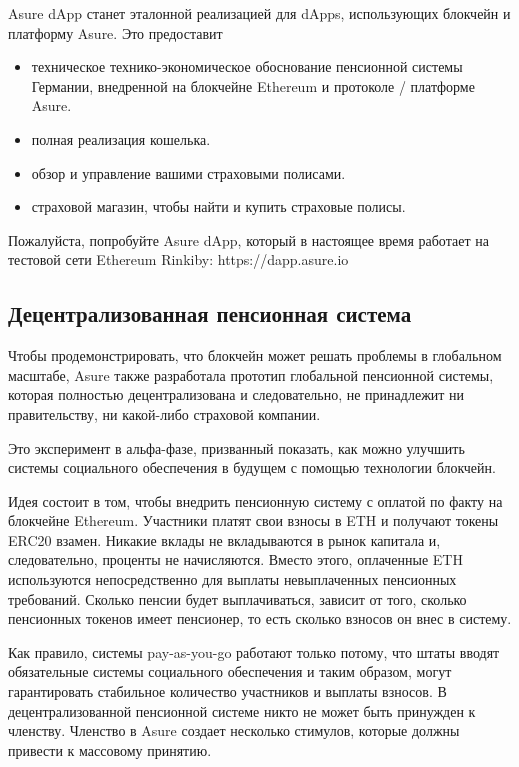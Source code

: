 Asure dApp станет эталонной реализацией для dApps, использующих блокчейн и платформу Asure.
\newline\newline
Это предоставит
\begin{itemize}
\item техническое технико-экономическое обоснование пенсионной системы Германии, внедренной на блокчейне Ethereum и протоколе / платформе Asure.
\item полная реализация кошелька.
\item обзор и управление вашими страховыми полисами.
\item страховой магазин, чтобы найти и купить страховые полисы.
\end{itemize}

Пожалуйста, попробуйте Asure dApp, который в настоящее время работает на тестовой сети Ethereum Rinkiby: https://dapp.asure.io

\subsection{Децентрализованная пенсионная система}

Чтобы продемонстрировать, что блокчейн может решать проблемы в глобальном масштабе, Asure также разработала прототип глобальной пенсионной системы, которая полностью децентрализована и следовательно, не принадлежит ни правительству, ни какой-либо страховой компании.

Это эксперимент в альфа-фазе, призванный показать, как можно улучшить системы социального обеспечения в будущем с помощью технологии блокчейн.

Идея состоит в том, чтобы внедрить пенсионную систему с оплатой по факту на блокчейне Ethereum. Участники платят свои взносы в ETH и получают токены ERC20 взамен. Никакие вклады не вкладываются в рынок капитала и, следовательно, проценты не начисляются. Вместо этого, оплаченные ETH используются непосредственно для выплаты невыплаченных пенсионных требований. Сколько пенсии будет выплачиваться, зависит от того, сколько пенсионных токенов имеет пенсионер, то есть сколько взносов он внес в систему.

Как правило, системы pay-as-you-go работают только потому, что штаты вводят обязательные системы социального обеспечения и таким образом, могут гарантировать стабильное количество участников и выплаты взносов. В децентрализованной пенсионной системе никто не может быть принужден к членству. Членство в Asure создает несколько стимулов, которые должны привести к массовому принятию.

